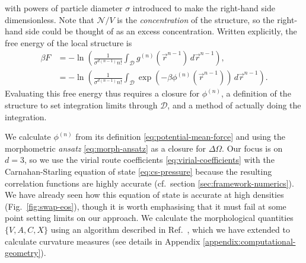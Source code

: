 \documentclass[11pt,twoside]{report}
\begin{document}
with powers of particle diameter $\sigma$ introduced to make the right-hand side dimensionless.
Note that $\mathcal{N} / V$ is the \emph{concentration} of the structure, so the right-hand side could be thought of as an excess concentration.
Written explicitly, the free energy of the local structure is
\begin{equation}\label{eq:local-structure-free-energy}
  \begin{split}
    \beta F
    &=
    -\ln{
      \left(
        \frac{1}{\sigma^{d(n-1)} n!}
        \int_{\mathcal{D}}
        g^{(n)}(\vec{r}^{n-1}) \, d\vec{r}^{n-1}
      \right)
    },
    \\
    &=
    -\ln{
      \left(
        \frac{1}{\sigma^{d(n-1)} n!}
        \int_{\mathcal{D}}
        \exp{\left(-\beta\phi^{(n)}(\vec{r}^{n-1})\right)}
        \, d\vec{r}^{n-1}
      \right)
    }.
  \end{split}
\end{equation}
Evaluating this free energy thus requires a closure for $\phi^{(n)}$, a definition of the structure to set integration limits through $\mathcal{D}$, and a method of actually doing the integration.

We calculate $\phi^{(n)}$ from its definition \eqref{eq:potential-mean-force} and using the morphometric \emph{ansatz} \eqref{eq:morph-ansatz} as a closure for $\Delta \Omega$.
Our focus is on $d=3$, so we use the virial route coefficients \eqref{eq:virial-coefficients} with the Carnahan-Starling equation of state \eqref{eq:cs-pressure} because the resulting correlation functions are highly accurate (cf.\ section \ref{sec:framework-numerics}).
We have already seen how this equation of state is accurate at high densities (Fig.\ \ref{fig:swap-eos}), though it is worth emphasising that it must fail at some point setting limits on our approach.
We calculate the morphological quantities $\{V, A, C, X\}$ using an algorithm described in Ref.\ \cite{KleninJCC2011}, which we have extended to calculate curvature measures (see details in Appendix \ref{appendix:computational-geometry}).
\end{document}
